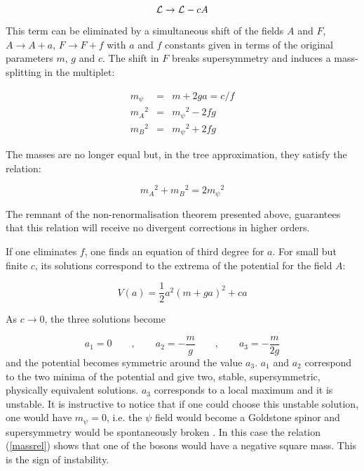 \documentclass[a4paper,11pt]{article}
\begin{document}
\begin{equation}
\label{break}
{\cal{L}}  \to  {\cal{L}} -cA
\end{equation}



This term can be eliminated by a simultaneous shift of the fields $A$ and $F$, 
$A \rightarrow A+a$, $F \rightarrow F+f$ with $a$ and $f$ constants given in terms of the original parameters $m$, $g$ and $c$. The shift in $F$ breaks supersymmetry and induces a mass-splitting in the multiplet:
\newpage

\begin{eqnarray}
\label{massform}
m_{\psi} & = & m +2ga = c/f \nonumber \\
{m_A}^2 & = & {m_{\psi}}^2 - 2fg \\
{m_B}^2 & = & {m_{\psi}}^2 + 2fg \nonumber
\end{eqnarray}

The masses are no longer equal but, in the tree approximation, they satisfy the relation:

\begin{equation}
\label{massrel}
{m_A}^2 +{m_B}^2 = 2 {m_{\psi}}^2
\end{equation}

The remnant of the non-renormalisation theorem presented above, guarantees that this relation will receive no divergent corrections in higher orders.

If one eliminates $f$, one finds an equation of third degree for $a$. For small but finite $c$, its solutions correspond to the extrema of the potential for the field $A$:

\begin{equation} 
\label{potent}
V(a) =  {\scriptstyle {\frac{1}{2}}}a^2 (m+ga)^2 + ca
\end{equation}

As $c \rightarrow 0$, the three solutions become

\begin{equation} 
\label{solut}
a_1 =0  \qquad , \qquad a_2 = -\frac{m}{g}  \qquad , \qquad a_3 =  -\frac{m}{2g}
\end{equation}
\noindent
and the potential becomes symmetric around the value $a_3$. $a_1$ and $a_2$ correspond to the two minima of the potential and give two, stable, supersymmetric, physically equivalent solutions. $a_3$ corresponds to a local maximum and it is unstable. It is instructive to notice that if one could choose this unstable solution, one would have $m_{\psi} = 0$, i.e. the $\psi$ field would become a Goldstone spinor and supersymmetry would be spontaneously broken \cite{IZ}. In this case the relation (\ref{massrel}) shows that one of the bosons would have a negative square mass. This is the sign of instability.
\end{document}
